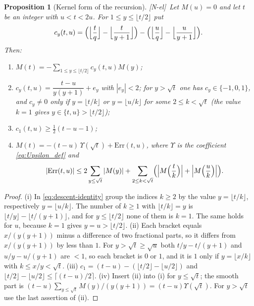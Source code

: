 \documentclass[11pt]{amsart}
\numberwithin{equation}{section}
\theoremstyle{plain}
\newtheorem{proposition}[theorem]{Proposition}
\theoremstyle{definition}
\theoremstyle{remark}
\newcommand{\tagNE}{\textup{[N-el]}}
\begin{document}
\begin{proposition}[Kernel form of the recursion]
\label{prop:kernel}
\tagNE\ Let $M(u)=0$ and let $t$ be an integer with $u<t<2u$. For $1\le y\le\lfloor t/2\rfloor$ put
\[
c_y(t,u)=\Bigl(\Bigl\lfloor\frac tq\Bigr\rfloor-\Bigl\lfloor\frac t{y+1}\Bigr\rfloor\Bigr)
-\Bigl(\Bigl\lfloor\frac uq\Bigr\rfloor-\Bigl\lfloor\frac u{y+1}\Bigr\rfloor\Bigr).
\]
Then:
\begin{enumerate}[label=\textup{(\roman*)}]
\item $M(t)=-\sum_{1\le y\le\lfloor t/2\rfloor}c_y(t,u)M(y)$;
\item $c_y(t,u)=\dfrac{t-u}{y(y+1)}+e_y$ with $|e_y|<2$; for $y>\sqrt t$
one has $c_y\in\{-1,0,1\}$, and $c_y\ne0$ only if $y=\lfloor t/k\rfloor$ or
$y=\lfloor u/k\rfloor$ for some $2\le k<\sqrt t$ (the value $k=1$ gives $y\in\{t,u\}>\lfloor t/2\rfloor$);
\item $c_1(t,u)\ge\frac12(t-u-1)$;
\item $M(t)=-(t-u)\,\Upsilon(\sqrt t)+\mathrm{Err}(t,u)$, where $\Upsilon$ is the
coefficient \eqref{eq:Upsilon_def} and
\[
|\mathrm{Err}(t,u)|\le2\sum_{y\le\sqrt t}|M(y)|
+\sum_{2\le k<\sqrt t}\Bigl(\Bigl|M\Bigl(\frac tk\Bigr)\Bigr|+\Bigl|M\Bigl(\frac uk\Bigr)\Bigr|\Bigr).
\]
\end{enumerate}
\end{proposition}

\begin{proof}
(i) In \eqref{eq:descent-identity} group the indices $k\ge2$ by the value
$y=\lfloor t/k\rfloor$, respectively $y=\lfloor u/k\rfloor$. The number of
$k\ge1$ with $\lfloor t/k\rfloor=y$ is
$\lfloor t/y\rfloor-\lfloor t/(y+1)\rfloor$, and for $y\le\lfloor t/2\rfloor$ none of them
is $k=1$. The same holds for $u$, because $k=1$ gives $y=u>\lfloor t/2\rfloor$. (ii) Each
bracket equals $x/(y(y+1))$ minus a difference of two fractional parts, so
it differs from $x/(y(y+1))$ by less than $1$. For $y>\sqrt t\ge\sqrt u$ both
$t/y-t/(y+1)$ and $u/y-u/(y+1)$ are $<1$, so each bracket is $0$ or $1$, and
it is $1$ only if $y=\lfloor x/k\rfloor$ with $k\le x/y<\sqrt t$.
(iii) $c_1=(t-u)-(\lfloor t/2\rfloor-\lfloor u/2\rfloor)$ and
$\lfloor t/2\rfloor-\lfloor u/2\rfloor\le\lceil(t-u)/2\rceil$.
(iv) Insert (ii) into (i) for $y\le\sqrt t$; the smooth part is
$(t-u)\sum_{y\le\sqrt t}M(y)/(y(y+1))=(t-u)\Upsilon(\sqrt t)$. For
$y>\sqrt t$ use the last assertion of (ii).
\end{proof}
\end{document}
